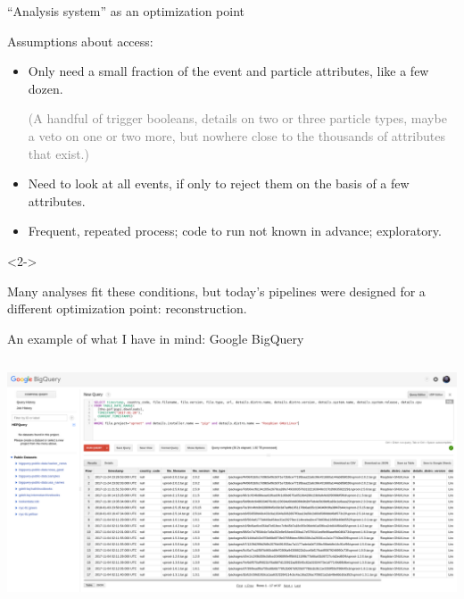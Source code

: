 \documentclass[aspectratio=169]{beamer}
\begin{document}
\begin{frame}{``Analysis system'' as an optimization point}
\vspace{0.25 cm}
\begin{block}{Assumptions about access:}
\begin{itemize}\setlength{\itemsep}{0.35 cm}
\item Only need a small fraction of the event and particle attributes, like a few dozen.

\vspace{0.1 cm}
\textcolor{gray}{(A handful of trigger booleans, details on two or three particle types, maybe a veto on one or two more, but nowhere close to the thousands of attributes that exist.)}

\item Need to look at all events, if only to reject them on the basis of a few attributes.

\item Frequent, repeated process; code to run not known in advance; exploratory.
\end{itemize}
\end{block}

\begin{uncoverenv}<2->\begin{block}{Many analyses fit these conditions, but today's pipelines were designed for a different optimization point: reconstruction.}
\vspace{0.25 cm}
\end{block}
\end{uncoverenv}
\end{frame}

\begin{frame}{An example of what I have in mind: Google BigQuery}
\vspace{0.25 cm}
\begin{columns}
\includegraphics[width=\linewidth]{bigquery.png}
\end{columns}
\end{frame}
\end{document}
